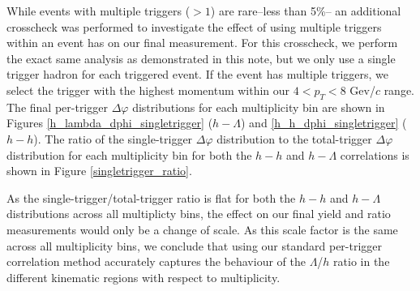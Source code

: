 \documentclass[ALICE,manyauthors]{ALICE_analysis_notes}
\begin{document}
While events with multiple triggers ($> 1$) are rare--less than 5\%-- an additional crosscheck was performed to investigate the effect of using multiple triggers within an event has on our final measurement. For this crosscheck, we perform the exact same analysis as demonstrated in this note, but we only use a single trigger hadron for each triggered event. If the event has multiple triggers, we select the trigger with the highest momentum within our $4 < p_{T} < 8$ Gev/$c$ range. The final per-trigger $\Delta\varphi$ distributions for each multiplicity bin are shown in Figures \ref{h_lambda_dphi_singletrigger} ($h-\Lambda$) and \ref{h_h_dphi_singletrigger} ($h-h$). The ratio of the single-trigger $\Delta\varphi$ distribution to the total-trigger $\Delta\varphi$ distribution for each multiplicity bin for both the $h-h$ and $h-\Lambda$ correlations is shown in Figure \ref{singletrigger_ratio}.

As the single-trigger/total-trigger ratio is flat for both the $h-h$ and $h-\Lambda$ distributions across all multiplicty bins, the effect on our final yield and ratio measurements would only be a change of scale.  As this scale factor is the same across all multiplicity bins, we conclude that using our standard per-trigger correlation method accurately captures the behaviour of the $\Lambda$/$h$ ratio in the different kinematic regions with respect to multiplicity.
\end{document}
